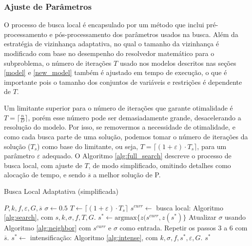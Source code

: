 \documentclass{MO824}
\begin{document}
    \subsubsection{Ajuste de Parâmetros}
    O processo de busca local é encapsulado por um método que inclui pré-processa\-mento e pós-processamento dos parâmetros usados na busca. Além da estratégia de vizinhança adaptativa, no qual o tamanho da vizinhança é modificado com base no desempenho do resolvedor matemático para o subproblema, o número de iterações $T$ usado nos modelos descritos nas seções \ref{model} e \ref{new_model} também é ajustado em tempo de execução, o que é importante pois o tamanho dos conjuntos de variáveis e restrições é dependente de $T$. 
    
    Um limitante superior para o número de iterações que garante otimalidade é $T=\lceil\frac{n}{D}\rceil$, porém esse número pode ser demasiadamente grande, desacelerando a resolução do modelo. Por isso, se removermos a necessidade de otimalidade, e como cada busca parte de uma solução, podemos tomar o número de iterações da solução ($T_s$) como base do limitante, ou seja, $T = \lceil (1+\varepsilon)\cdot T_s \rceil$, para um parâmetro $\varepsilon$ adequado. O Algoritmo \ref{alg:full_search} descreve o processo de busca local, com ajuste de $T$, de modo simplificado, omitindo detalhes como alocação de tempo, e sendo $\overline{s}$ a melhor solução de P.
    
    \begin{algorithm}[H]
    \caption{Busca Local Adaptativa (simplificada)}
    \label{alg:full_search}
    \begin{algorithmic}[1]
        \REQUIRE $P, k, f, \varepsilon, G, \overline{s}$
        \STATE $\sigma \leftarrow 0.5$
            \STATE $T \leftarrow \lceil (1+\varepsilon)\cdot T_s \rceil$  
            \STATE $s^{curr} \leftarrow$ busca local: Algoritmo \ref{alg:search}, com $s, k, \sigma, f, T, G$.
            \STATE $s^* \leftarrow \text{argmax}\{z(s^{curr}, z(s^*)\}$  
            \STATE Atualizar $\sigma$ usando Algoritmo \ref{alg:neighbor} com $s^{curr}$ e $\sigma$ como entrada.
        \ENDFOR
        \STATE Repetir os passos 3 a 6 com $\overline{s}$.
        \STATE $s^* \leftarrow$ intensificação: Algoritmo \ref{alg:intense}, com $k, \sigma, f, s^*, \varepsilon, G$.
        \RETURN $s^*$
    \end{algorithmic}
    \end{algorithm}
    
\end{document}
